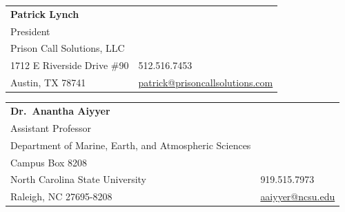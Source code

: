 \documentclass[margin,line]{resume}
\begin{document}
\begin{resume}

\begin{tabular}{@{}p{9cm}p{3cm}}
\textbf{Patrick Lynch}\\
President\\
Prison Call Solutions, LLC\\
1712 E Riverside Drive \#90					&  512.516.7453\\
Austin, TX 78741						&  \href{mailto:patrick@prisoncallsolutions.com}{patrick@prisoncallsolutions.com}\\
\end{tabular}

\begin{tabular}{@{}p{9cm}p{3cm}}
\textbf{Dr.\ Anantha Aiyyer}\\
Assistant Professor\\
Department of Marine, Earth, and Atmospheric Sciences\\
Campus Box 8208\\
North Carolina State University					&  919.515.7973\\
Raleigh, NC  27695-8208						&  \href{mailto:aaiyyer@ncsu.edu }{aaiyyer@ncsu.edu}\\
\end{tabular}




\end{resume}
\end{document}

